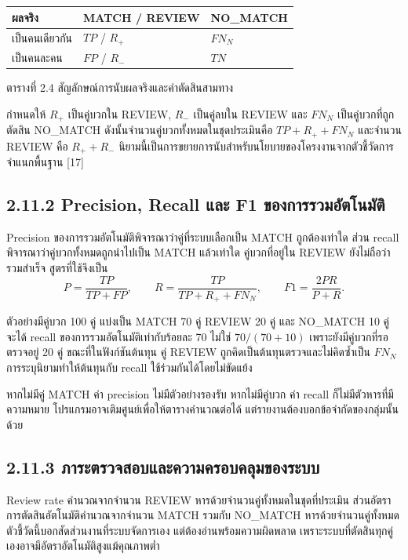 \documentclass[12pt,a4paper]{report}
\begin{document}
\begin{center}\small
\begin{tabularx}{\linewidth}{p{3.2cm}XX}
\toprule
ผลจริง & MATCH / REVIEW & NO\_MATCH \\
\midrule
เป็นคนเดียวกัน & $TP$ / $R_+$ & $FN_N$ \\
เป็นคนละคน & $FP$ / $R_-$ & $TN$ \\
\bottomrule
\end{tabularx}
\par ตารางที่ 2.4 สัญลักษณ์การนับผลจริงและคำตัดสินสามทาง
\end{center}

กำหนดให้ $R_+$ เป็นคู่บวกใน REVIEW, $R_-$ เป็นคู่ลบใน REVIEW และ $FN_N$ เป็นคู่บวกที่ถูกตัดสิน NO\_MATCH ดังนั้นจำนวนคู่บวกทั้งหมดในชุดประเมินคือ $TP+R_++FN_N$ และจำนวน REVIEW คือ $R_++R_-$ นิยามนี้เป็นการขยายการนับสำหรับนโยบายของโครงงานจากตัวชี้วัดการจำแนกพื้นฐาน [17]

\subsection*{2.11.2 Precision, Recall และ F1 ของการรวมอัตโนมัติ}
Precision ของการรวมอัตโนมัติพิจารณาว่าคู่ที่ระบบเลือกเป็น MATCH ถูกต้องเท่าใด ส่วน recall พิจารณาว่าคู่บวกทั้งหมดถูกนำไปเป็น MATCH แล้วเท่าใด คู่บวกที่อยู่ใน REVIEW ยังไม่ถือว่ารวมสำเร็จ สูตรที่ใช้จึงเป็น
\begin{equation*}
P=\frac{TP}{TP+FP},\qquad
R=\frac{TP}{TP+R_++FN_N},\qquad
F1=\frac{2PR}{P+R}.
\end{equation*}

ตัวอย่างมีคู่บวก 100 คู่ แบ่งเป็น MATCH 70 คู่ REVIEW 20 คู่ และ NO\_MATCH 10 คู่ จะได้ recall ของการรวมอัตโนมัติเท่ากับร้อยละ 70 ไม่ใช่ $70/(70+10)$ เพราะยังมีคู่บวกที่รอตรวจอยู่ 20 คู่ ขณะที่ในฟังก์ชันต้นทุน คู่ REVIEW ถูกคิดเป็นต้นทุนตรวจและไม่คิดซ้ำเป็น $FN_N$ การระบุนิยามทำให้ต้นทุนกับ recall ใช้ร่วมกันได้โดยไม่ขัดแย้ง

หากไม่มีคู่ MATCH ค่า precision ไม่มีตัวอย่างรองรับ หากไม่มีคู่บวก ค่า recall ก็ไม่มีตัวหารที่มีความหมาย โปรแกรมอาจเติมศูนย์เพื่อให้ตารางคำนวณต่อได้ แต่รายงานต้องบอกข้อจำกัดของกลุ่มนั้นด้วย

\subsection*{2.11.3 ภาระตรวจสอบและความครอบคลุมของระบบ}
Review rate คำนวณจากจำนวน REVIEW หารด้วยจำนวนคู่ทั้งหมดในชุดที่ประเมิน ส่วนอัตราการตัดสินอัตโนมัติคำนวณจากจำนวน MATCH รวมกับ NO\_MATCH หารด้วยจำนวนคู่ทั้งหมด ตัวชี้วัดนี้บอกสัดส่วนงานที่ระบบจัดการเอง แต่ต้องอ่านพร้อมความผิดพลาด เพราะระบบที่ตัดสินทุกคู่เองอาจมีอัตราอัตโนมัติสูงแม้คุณภาพต่ำ
\end{document}
